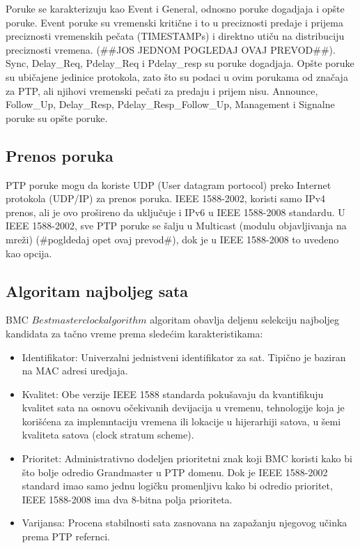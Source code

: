 \documentclass[a4paper,12pt, master]{etf}
\begin{document}
	Poruke se karakterizuju kao Event i General, odnosno poruke dogadjaja i
	op\v{s}te poruke. Event	poruke su vremenski kriti\v{c}ne i to u preciznosti
	predaje i prijema preciznosti vremenskih pe\v{c}ata (TIMESTAMPs) i direktno
	uti\v{c}u na distribuciju preciznosti vremena. (\#\#JOS JEDNOM POGLEDAJ
	OVAJ PREVOD\#\#). Sync, Delay\_Req, Pdelay\_Req i Pdelay\_resp su poruke
	dogadjaja. Op\v{s}te poruke su ubi\v{c}ajene jedinice protokola, zato
	\v{s}to su podaci u ovim porukama od zna\v{c}aja za PTP, ali njihovi
	vremenski pe\v{c}ati za predaju i prijem nisu. Announce, Follow\_Up,
	Delay\_Resp, Pdelay\_Resp\_Follow\_Up, Management i Signalne poruke su
	op\v{s}te poruke.

	\subsection{Prenos poruka}

	PTP poruke mogu da koriste UDP (User datagram portocol) preko Internet
	protokola (UDP/IP) za prenos poruka. IEEE 1588-2002, koristi samo IPv4
	prenos, ali je ovo pro\v{s}ireno da	uklju\v{c}uje i IPv6 u IEEE 1588-2008
	standardu. U IEEE 1588-2002, sve PTP poruke se \v{s}alju u Multicast
	(modulu objavljivanja na mre\v{z}i) (\#pogldedaj opet ovaj prevod\#), dok
	je u IEEE 1588-2008 to uvedeno kao opcija.

	\subsection{Algoritam najboljeg sata}
	BMC \(Best master clock algorithm\) algoritam obavlja deljenu selekciju
	najboljeg kandidata	za ta\v{c}no vreme prema slede\'{c}im karakteristikama:

	\begin{itemize}
		\item Identifikator: Univerzalni jednistveni identifikator za sat.
		Tipi\v{c}no je baziran na MAC adresi uredjaja.
		\item Kvalitet: Obe verzije IEEE 1588 standarda poku\v{s}avaju da
		kvantifikuju kvalitet sata na osnovu o\v{c}ekivanih devijacija u
		vremenu, tehnologije koja je kori\v{s}\'{c}ena za implemntaciju vremena
		ili lokacije u hijerarhiji satova, u \v{s}emi kvaliteta satova (clock
		stratum scheme).
		\item Prioritet: Administrativno dodeljen prioritetni znak koji BMC
		koristi kako bi \v{s}to bolje odredio Grandmaster u PTP domenu. Dok je
		IEEE 1588-2002 standard imao samo jednu logi\v{c}ku promenljivu kako bi
		odredio prioritet, IEEE 1588-2008 ima dva 8-bitna polja prioriteta.
		\item Varijansa: Procena stabilnosti sata zasnovana na zapa\v{z}anju
		njegovog u\v{c}inka prema PTP refernci.
	\end{itemize}
\end{document}
